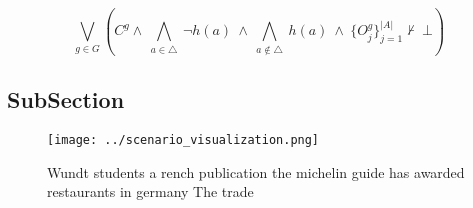 \documentclass[a4paper]{article}
\begin{document}
\[\bigvee_{g\in G} (C^g \wedge\ \bigwedge_{a\in \triangle}\ \neg h(a)\ \wedge\ \bigwedge_{a\notin \triangle}\ h(a)\ \wedge\ \{O_j^g\}_{j=1}^{|A|} \nvdash\ \bot )\]

\subsection{SubSection}

\begin{figure}
\centering
\texttt{[image: ../scenario\_visualization.png]}
\caption{Wundt students a rench publication the michelin guide has awarded restaurants in germany The trade 
}
\end{figure}
 
\end{document}
